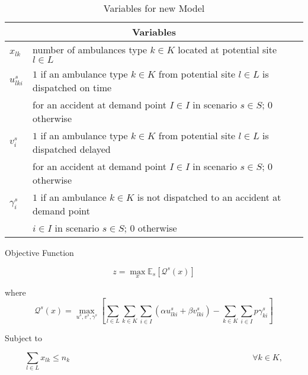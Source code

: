 \begin{table}[h]
\centering
\begin{tabular}{ll}
\hline
\multicolumn{2}{c}{Variables}                                                                                   \\ \hline
$x_{lk}$      & number of ambulances type $k \in K$ located at potential site $l \in L$                         \\                
$u_{lki}^s$  & $1$ if an ambulance type $k \in K$ from potential site $l \in L$ is dispatched on time                  \\
              & for an accident at demand point $I \in I$ in scenario $s \in S$; $0$ otherwise                                                                                    \\
$v_i^s$ & $1$ if an ambulance type $k \in K$ from potential site $l \in L$ is dispatched delayed                  \\
              & for an accident at demand point $I \in I$ in scenario $s \in S$; $0$ otherwise                                   \\
$\gamma_i^s$  & $1$ if an ambulance $k \in K$ is not dispatched to an accident at demand point          \\
              & $i \in I$ in scenario $ s \in S$; $0$ otherwise      \\ \hline                
\end{tabular}
\caption{Variables for new Model}
\label{tab:my-table2}
\end{table}

Objective Function

\begin{equation}
    z = \max_{x} \mathbb{E}_s [ \mathcal{Q}^s(x)]
    \label{obj}
\end{equation}

where 
\begin{equation}
    \mathcal{Q}^s(x) = \max_{u^s, v^s, \gamma^s} \left[ {\sum_{l \in L} \sum_{k \in K} \sum_{i \in I}} (\alpha u_{lki}^s + \beta v_{lki}^s) - \sum_{k \in K} \sum_{i \in I} p \gamma_{ki}^s \right]
    \label{obj2}
\end{equation}

Subject to

\begin{equation}
    \sum_{l \in L} x_{lk} \leq n_k  \qquad \qquad \qquad \qquad \qquad \qquad \qquad \qquad \qquad \qquad \qquad \forall k \in K,
    \label{eq3}
\end{equation}

